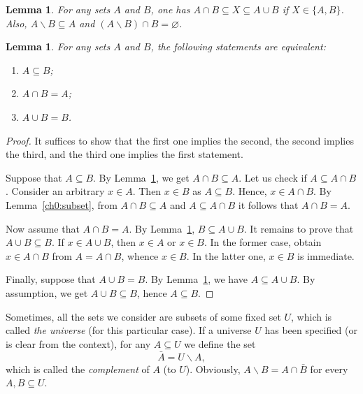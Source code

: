 \documentclass[12pt,notitlepage]{article}
\theoremstyle{plain}
\newtheorem{lemma}[thm]{Lemma}
\theoremstyle{definition}
\theoremstyle{plain}
\newcommand{\sbs}{\subseteq}
\renewcommand{\setminus}{\smallsetminus}
\newcommand{\void}{\varnothing}
\newcommand{\1}{\mathbf{1}}
\newcommand{\0}{\mathbf{0}}
\newcommand{\mcomm}[1]{}
\begin{document}
\begin{lemma}\label{ch0:l3}
For any sets $A$ and $B$, one has $A \cap B \sbs X \sbs A \cup B$ if $X \in \{A,B\}$. Also, $A \setminus B \sbs A$ and $(A \setminus B) \cap B = \void$.
\end{lemma}
\begin{lemma}\label{ch0:lattice}
For any sets $A$ and $B$, the following statements are equivalent:
\begin{enumerate}
\item $A \sbs B$;
\item $A \cap B = A$;
\item $A \cup B = B$.
\end{enumerate}
\end{lemma}
\begin{proof}
It suffices to show that the first one implies the second, the second implies the third, and the third one implies the first statement.

Suppose that $A \sbs B$. By Lemma~\ref{ch0:l3}, we get $A \cap B \sbs A$. Let us check if $A \sbs A \cap B$. Consider an arbitrary $x \in A$. Then $x \in B$ as $A \sbs B$. Hence, $x \in A \cap B$. By Lemma~\ref{ch0:subset}, from $A \cap B \sbs A$ and $A \sbs A \cap B$ it follows that $A \cap B = A$.

Now assume that $A \cap B = A$. By Lemma~\ref{ch0:l3}, $B \sbs A \cup B$. It remains to prove that $A \cup B \sbs B$. If $x \in A \cup B$, then $x \in A$ or $x \in B$. In the former case, obtain $x \in A \cap B$ from $A = A \cap B$, whence $x \in B$. In the latter one, $x \in B$ is immediate.

Finally, suppose that $A \cup B = B$. By Lemma~\ref{ch0:l3}, we have $A \sbs A \cup B$. By assumption, we get $A \cup B \sbs B$, hence $A \sbs B$.
\end{proof}

Sometimes, all the sets we consider are subsets of some fixed set $U$, which is called \emph{the universe} (for this particular case). If a universe $U$ has been specified (or is clear from the context), for any $A \sbs U$ we define the set
$$\bar A = U \setminus A,$$
which is called the \emph{complement} of $A$ (to $U$). Obviously, $A \setminus B = A \cap \bar B$ for every $A, B \sbs U$.

\mcomm{Some students mistake this `universe' for ``the set of all sets''. The Instructor should discourage this misconception.}
\end{document}
